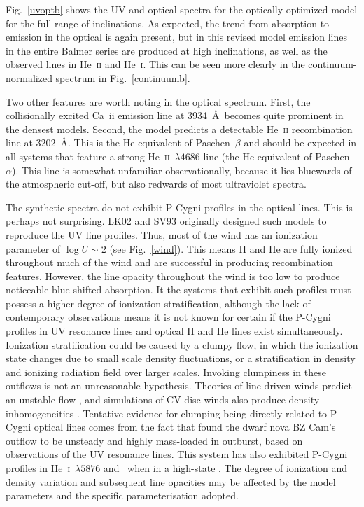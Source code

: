 Fig.~\ref{uvoptb} shows the UV and optical spectra for the
optically optimized model for the full range of inclinations. 
As expected, the trend from absorption to emission 
in the optical is again present, but in this revised model emission
lines in the entire Balmer series are produced at high inclinations, as well
as the observed lines 
in He~\textsc{ii} and He~\textsc{i}. This can be seen more clearly in the 
continuum-normalized spectrum in Fig.~\ref{continuumb}.

Two other features are worth noting in the optical
spectrum. First, the collisionally excited Ca~{\sc ii} emission line at 3934~\AA\ 
becomes quite prominent in the densest models. Second, the model predicts a detectable
He~\textsc{ii} recombination line at 3202~\AA. This is the He
equivalent of Paschen~$\beta$ and should be expected in all systems that
feature a strong He~\textsc{ii}~$\lambda4686$ line (the He
equivalent of Paschen~$\alpha$). 
This line is somewhat unfamiliar observationally, because it 
lies bluewards of the atmospheric cut-off, but
also redwards of most ultraviolet spectra. 

The synthetic spectra do not exhibit P-Cygni profiles in the optical lines.
This is perhaps not surprising. LK02 and SV93 originally designed such models
to reproduce the UV line profiles. Thus, most of the wind
has an ionization parameter of $\log U \sim 2$ (see Fig.~\ref{wind}).
This means H and He are fully ionized throughout 
much of the wind and are successful in producing recombination features.
However, the line opacity throughout the wind is too
low to produce noticeable blue shifted absorption. 
It the systems that exhibit such profiles must 
possess a higher degree of ionization stratification, although the lack 
of contemporary observations means it is not known for certain if the 
P-Cygni profiles in UV resonance lines and optical H and He lines exist simultaneously.
Ionization stratification could be caused by a clumpy flow, in which the 
ionization state 
changes due to small scale density fluctuations, or a stratification in density
and ionizing radiation field over larger scales.
Invoking clumpiness in these outflows is not an unreasonable
hypothesis. Theories of line-driven winds predict an unstable flow
\citep{macgregor1979,owockirybicki1984,owockirybicki1985}, and
simulations of CV disc winds also produce density inhomogeneities 
\citep{proga1998,pkdh2002}.
Tentative evidence for clumping being directly related to P-Cygni optical lines
comes from the fact that \cite{prinja2000}
found the dwarf nova BZ Cam's outflow to be unsteady and highly mass-loaded in outburst,
based on observations of the UV resonance lines.
This system has also exhibited P-Cygni profiles in He~\textsc{i}~$\lambda5876$
and \ha\ when in a high-state \citep{patterson1996,RN98}. 
The degree of ionization and density variation and 
subsequent line opacities may be affected by the model parameters
and the specific parameterisation adopted.

